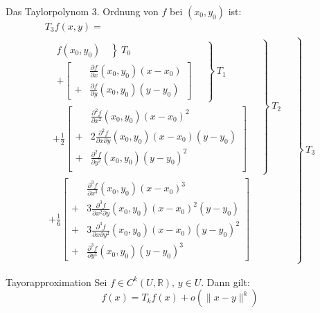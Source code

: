 \documentclass[a4paper,10pt]{article}
\def\R{\mathbb{R}}
\begin{document}
Das Taylorpolynom 3. Ordnung von \( f \) bei \( (x_0, y_0) \) ist:
\begin{multline*}
    T_3 f(x, y) = \\
    \left. \begin{aligned}
        \left. \begin{aligned}
            \left. \begin{aligned}
                \left.
                    f(x_0, y_0)
                \quad \right\} \ T_0 \\
                + \left[ \begin{aligned}
                    &\frac{\partial f}{\partial x} (x_0, y_0)(x - x_0) \\
                    + &\frac{\partial f}{\partial y} (x_0, y_0)(y - y_0)
                \end{aligned} \right]
            \end{aligned} \quad \right\} \ T_1 \\
            + \frac{1}{2} \left[ \begin{aligned}
                &\frac{\partial^2 f}{\partial x^2} (x_0, y_0)(x - x_0)^2 \\
                + &2 \frac{\partial^2 f}{\partial x \partial y} (x_0, y_0)(x - x_0)(y - y_0) \\
                + &\frac{\partial^2 f}{\partial y^2} (x_0, y_0)(y - y_0)^2 \\
            \end{aligned} \right]
        \end{aligned} \quad \right\} \ T_2 \\
        + \frac{1}{6} \left[ \begin{aligned}
            &\frac{\partial^3 f}{\partial x^3} (x_0, y_0)(x - x_0)^3 \\
            + &3 \frac{\partial^3 f}{\partial x^2 \partial y} (x_0, y_0)(x - x_0)^2(y - y_0) \\
            + &3 \frac{\partial^3 f}{\partial x \partial y^2} (x_0, y_0)(x - x_0)(y - y_0)^2 \\
            + &\frac{\partial^3 f}{\partial y^3} (x_0, y_0)(y - y_0)^3
        \end{aligned} \right]
    \end{aligned} \quad \right\} \ T_3
\end{multline*}

\begin{mainbox}{Tayorapproximation}
    Sei \( f \in C^k(U, \R), \, y \in U \). Dann gilt:
    \[
        f(x) = T_k f(x) + o(\| x - y \|^k)
    \]
\end{mainbox}
\end{document}
